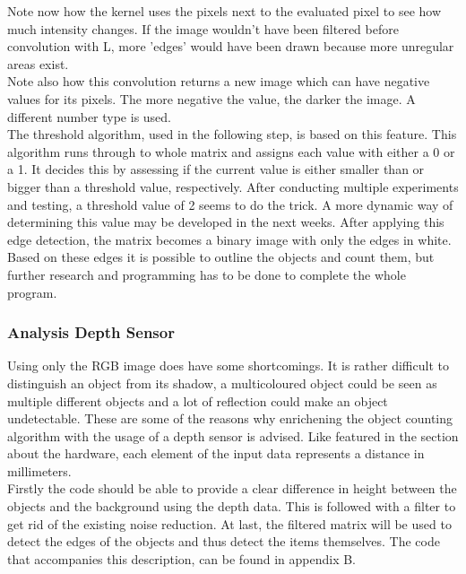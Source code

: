 \documentclass[11pt]{article}
\begin{document}
\noindent Note now how the kernel uses the pixels next to the evaluated pixel to see how much intensity changes. If the image wouldn't have been filtered before convolution with L, more 'edges' would have been drawn because more unregular areas exist.\\
Note also how this convolution returns a new image which can have negative values for its pixels. The more negative the value, the darker the image. A different number type is used.\\
The threshold algorithm, used in the following step, is based on this feature. This algorithm runs through to whole matrix and assigns each value with either a 0 or a 1. It decides this by assessing if the current value is either smaller than or bigger than a threshold value, respectively. After conducting multiple experiments and testing, a threshold value of 2 seems to do the trick. A more dynamic way of determining this value may be developed in the next weeks. After applying this edge detection, the matrix becomes a binary image with only the edges in white. Based on these edges it is possible to outline the objects and count them, but further research and programming has to be done to complete the whole program.

\subsubsection{Analysis Depth Sensor}
Using only the RGB image does have some shortcomings. It is rather difficult to distinguish an object from its shadow, a multicoloured object could be seen as multiple different objects and a lot of reflection could make an object undetectable. These are some of the reasons why enrichening the object counting algorithm with the usage of a depth sensor is advised. Like featured in the section about the hardware, each element of the input data represents a distance in millimeters.\\
Firstly the code should be able to provide a clear difference in height between the objects and the background using the depth data. This is followed with a filter to get rid of the existing noise reduction. At last, the filtered matrix will be used to detect the edges of the objects and thus detect the items themselves. The code that accompanies this description, can be found in appendix B.
 
\end{document}
